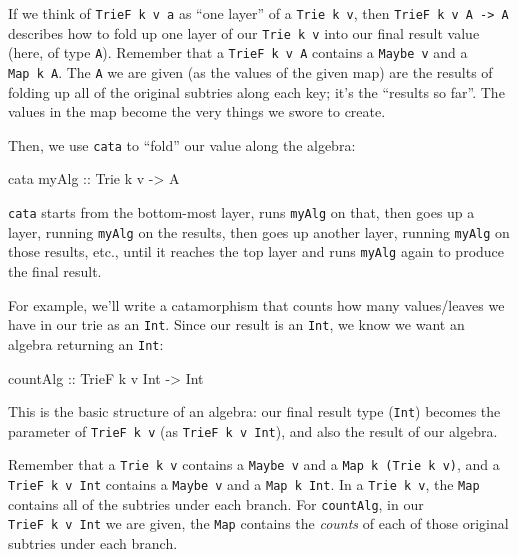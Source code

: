 \documentclass[]{article}
\newenvironment{Shaded}{}{}
\newcommand{\DataTypeTok}[1]{\textcolor[rgb]{0.56,0.13,0.00}{#1}}
\newcommand{\NormalTok}[1]{#1}
\newcommand{\OtherTok}[1]{\textcolor[rgb]{0.00,0.44,0.13}{#1}}
\begin{document}
If we think of \texttt{TrieF\ k\ v\ a} as ``one layer'' of a
\texttt{Trie\ k\ v}, then \texttt{TrieF\ k\ v\ A\ -\textgreater{}\ A} describes
how to fold up one layer of our \texttt{Trie\ k\ v} into our final result value
(here, of type \texttt{A}). Remember that a \texttt{TrieF\ k\ v\ A} contains a
\texttt{Maybe\ v} and a \texttt{Map\ k\ A}. The \texttt{A} we are given (as the
values of the given map) are the results of folding up all of the original
subtries along each key; it's the ``results so far''. The values in the map
become the very things we swore to create.

Then, we use \texttt{cata} to ``fold'' our value along the algebra:

\begin{Shaded}
\begin{Highlighting}[]
\NormalTok{cata}\OtherTok{ myAlg ::} \DataTypeTok{Trie}\NormalTok{ k v }\OtherTok{->} \DataTypeTok{A}
\end{Highlighting}
\end{Shaded}

\texttt{cata} starts from the bottom-most layer, runs \texttt{myAlg} on that,
then goes up a layer, running \texttt{myAlg} on the results, then goes up
another layer, running \texttt{myAlg} on those results, etc., until it reaches
the top layer and runs \texttt{myAlg} again to produce the final result.

For example, we'll write a catamorphism that counts how many values/leaves we
have in our trie as an \texttt{Int}. Since our result is an \texttt{Int}, we
know we want an algebra returning an \texttt{Int}:

\begin{Shaded}
\begin{Highlighting}[]
\OtherTok{countAlg ::} \DataTypeTok{TrieF}\NormalTok{ k v }\DataTypeTok{Int} \OtherTok{->} \DataTypeTok{Int}
\end{Highlighting}
\end{Shaded}

This is the basic structure of an algebra: our final result type (\texttt{Int})
becomes the parameter of \texttt{TrieF\ k\ v} (as \texttt{TrieF\ k\ v\ Int}),
and also the result of our algebra.

Remember that a \texttt{Trie\ k\ v} contains a \texttt{Maybe\ v} and a
\texttt{Map\ k\ (Trie\ k\ v)}, and a \texttt{TrieF\ k\ v\ Int} contains a
\texttt{Maybe\ v} and a \texttt{Map\ k\ Int}. In a \texttt{Trie\ k\ v}, the
\texttt{Map} contains all of the subtries under each branch. For
\texttt{countAlg}, in our \texttt{TrieF\ k\ v\ Int} we are given, the
\texttt{Map} contains the \emph{counts} of each of those original subtries under
each branch.
\end{document}
